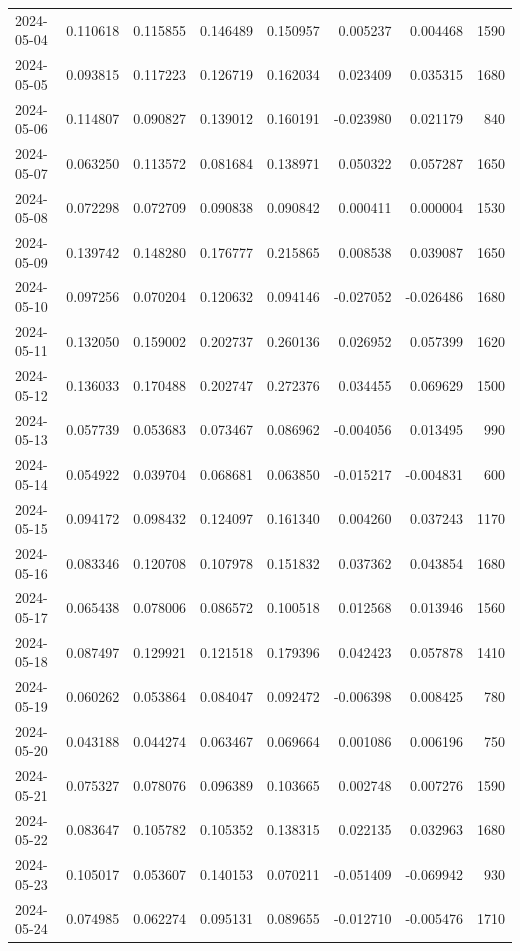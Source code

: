 \begin{tabular}{lrrrrrrr}
2024-05-04 & 0.110618 & 0.115855 & 0.146489 & 0.150957 & 0.005237 & 0.004468 & 1590 \\
2024-05-05 & 0.093815 & 0.117223 & 0.126719 & 0.162034 & 0.023409 & 0.035315 & 1680 \\
2024-05-06 & 0.114807 & 0.090827 & 0.139012 & 0.160191 & -0.023980 & 0.021179 & 840 \\
2024-05-07 & 0.063250 & 0.113572 & 0.081684 & 0.138971 & 0.050322 & 0.057287 & 1650 \\
2024-05-08 & 0.072298 & 0.072709 & 0.090838 & 0.090842 & 0.000411 & 0.000004 & 1530 \\
2024-05-09 & 0.139742 & 0.148280 & 0.176777 & 0.215865 & 0.008538 & 0.039087 & 1650 \\
2024-05-10 & 0.097256 & 0.070204 & 0.120632 & 0.094146 & -0.027052 & -0.026486 & 1680 \\
2024-05-11 & 0.132050 & 0.159002 & 0.202737 & 0.260136 & 0.026952 & 0.057399 & 1620 \\
2024-05-12 & 0.136033 & 0.170488 & 0.202747 & 0.272376 & 0.034455 & 0.069629 & 1500 \\
2024-05-13 & 0.057739 & 0.053683 & 0.073467 & 0.086962 & -0.004056 & 0.013495 & 990 \\
2024-05-14 & 0.054922 & 0.039704 & 0.068681 & 0.063850 & -0.015217 & -0.004831 & 600 \\
2024-05-15 & 0.094172 & 0.098432 & 0.124097 & 0.161340 & 0.004260 & 0.037243 & 1170 \\
2024-05-16 & 0.083346 & 0.120708 & 0.107978 & 0.151832 & 0.037362 & 0.043854 & 1680 \\
2024-05-17 & 0.065438 & 0.078006 & 0.086572 & 0.100518 & 0.012568 & 0.013946 & 1560 \\
2024-05-18 & 0.087497 & 0.129921 & 0.121518 & 0.179396 & 0.042423 & 0.057878 & 1410 \\
2024-05-19 & 0.060262 & 0.053864 & 0.084047 & 0.092472 & -0.006398 & 0.008425 & 780 \\
2024-05-20 & 0.043188 & 0.044274 & 0.063467 & 0.069664 & 0.001086 & 0.006196 & 750 \\
2024-05-21 & 0.075327 & 0.078076 & 0.096389 & 0.103665 & 0.002748 & 0.007276 & 1590 \\
2024-05-22 & 0.083647 & 0.105782 & 0.105352 & 0.138315 & 0.022135 & 0.032963 & 1680 \\
2024-05-23 & 0.105017 & 0.053607 & 0.140153 & 0.070211 & -0.051409 & -0.069942 & 930 \\
2024-05-24 & 0.074985 & 0.062274 & 0.095131 & 0.089655 & -0.012710 & -0.005476 & 1710 \\

\end{tabular}
